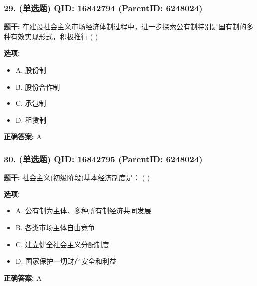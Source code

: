 \documentclass[12pt,UTF8]{ctexart}
\begin{document}
\subsubsection*{29. (单选题) \small QID: 16842794 (ParentID: 6248024)}

\textbf{题干:}
在建设社会主义市场经济体制过程中，进一步探索公有制特别是国有制的多种有效实现形式，积极推行 ( )



\textbf{选项:}
\begin{itemize}[leftmargin=*]

  \item A. 股份制

  \item B. 股份合作制

  \item C. 承包制

  \item D. 租赁制

\end{itemize}

\textbf{正确答案:}
A

\vspace{0.3em}\hrulefill\vspace{0.7em}

\subsubsection*{30. (单选题) \small QID: 16842795 (ParentID: 6248024)}

\textbf{题干:}
社会主义(初级阶段)基本经济制度是： ( )



\textbf{选项:}
\begin{itemize}[leftmargin=*]

  \item A. 公有制为主体、多种所有制经济共同发展

  \item B. 各类市场主体自由竞争

  \item C. 建立健全社会主义分配制度

  \item D. 国家保护一切财产安全和利益

\end{itemize}

\textbf{正确答案:}
A

\vspace{0.3em}\hrulefill\vspace{0.7em}
\end{document}
